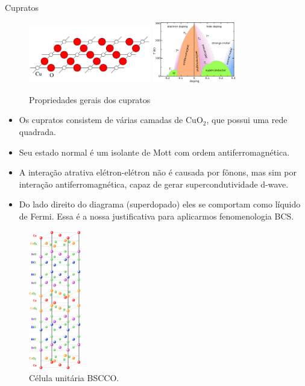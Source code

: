 \documentclass[a4paper,10pt]{article}
\begin{document}
\begin{section}{Cupratos}

\begin{figure}
\centering
   \includegraphics[width=0.475\textwidth]{fig/cuo2.png}
   \quad \quad
   \includegraphics[width=0.32\textwidth]{fig/cuprate-phasediag.png}
   \caption{Propriedades gerais dos cupratos}
\end{figure}


\begin{minipage}[b]{0.75\textwidth}
  \begin{itemize}
  \item Os cupratos consistem de várias camadas de CuO$_2$, que possui uma rede quadrada.
  \item Seu estado normal é um isolante de Mott com ordem antiferromagnética.
  \item A interação atrativa elétron-elétron não é causada por fônons, mas sim por interação antiferromagnética, capaz de gerar supercondutividade d-wave.
  \item Do lado direito do diagrama (superdopado) eles se comportam como líquido de Fermi. Essa é a nossa justificativa para aplicarmos fenomenologia BCS.
  \end{itemize}
\end{minipage}

\begin{figure}[H]
\centering
\includegraphics[width=0.2\textwidth]{fig/bscco-unitcell.png}
\caption{Célula unitária BSCCO.}
\label{fig:bscco-unitcell}
\end{figure}


\end{section}
\end{document}
